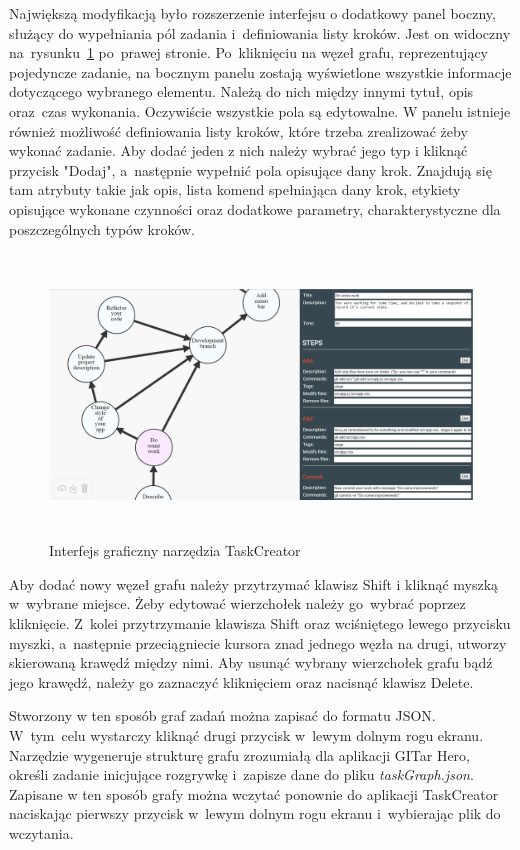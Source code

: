 \documentclass[12pt,a4paper,polish,thesis]{dcsbook}
\begin{document}
{	Największą modyfikacją było rozszerzenie interfejsu o dodatkowy panel boczny, służący do wypełniania pól zadania i~definiowania listy kroków. Jest on widoczny na~rysunku~\ref{fig:taskCreator} po~prawej stronie. Po~kliknięciu na węzeł grafu, reprezentujący pojedyncze zadanie, na bocznym panelu zostają wyświetlone wszystkie informacje dotyczącego wybranego elementu. Należą do nich między innymi tytuł, opis oraz~czas wykonania. Oczywiście wszystkie pola są edytowalne. W panelu istnieje również możliwość definiowania listy kroków, które trzeba zrealizować żeby wykonać zadanie. Aby dodać jeden z nich należy wybrać jego typ i kliknąć przycisk "Dodaj", a~następnie wypełnić pola opisujące dany krok. Znajdują się tam atrybuty takie jak opis, lista komend spełniająca dany krok, etykiety opisujące wykonane czynności oraz dodatkowe parametry, charakterystyczne dla poszczególnych typów kroków.
	
	\begin{figure}[h]
		\centering
		\includegraphics[height=7.5cm]{taskCreator01}
		\caption{Interfejs graficzny narzędzia TaskCreator}
		\label{fig:taskCreator}
	\end{figure}

	Aby dodać nowy węzeł grafu należy przytrzymać klawisz Shift i kliknąć myszką w~wybrane miejsce. Żeby edytować wierzchołek należy go~wybrać poprzez kliknięcie. Z~kolei przytrzymanie klawisza Shift oraz wciśniętego lewego przycisku myszki, a~następnie przeciągniecie kursora znad jednego węzła na drugi, utworzy skierowaną krawędź między nimi. Aby usunąć wybrany wierzchołek grafu bądź jego krawędź, należy go zaznaczyć kliknięciem oraz nacisnąć klawisz Delete.

	Stworzony w ten sposób graf zadań można zapisać do formatu JSON. W~tym~celu wystarczy kliknąć drugi przycisk w~lewym dolnym rogu ekranu. Narzędzie wygeneruje strukturę grafu zrozumiałą dla aplikacji GITar Hero, określi zadanie inicjujące rozgrywkę i~zapisze dane do pliku \textit{taskGraph.json}. Zapisane w ten sposób grafy można wczytać ponownie do aplikacji TaskCreator naciskając pierwszy przycisk w~lewym dolnym rogu ekranu i~wybierając plik do wczytania.
	
}
\end{document}
